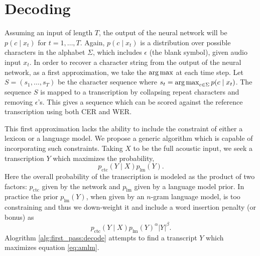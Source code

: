 \section{Decoding}
\label{sec:first_pass:decoding}

Assuming an input of length $T$, the output of the neural network will be $p(c
\mid x_t)$ for $t = 1,\ldots,T$. Again, $p(c \mid x_t)$ is a distribution over
possible characters in the alphabet $\Sigma$, which includes $\epsilon$ (the
blank symbol), given audio input $x_t$. In order to recover a character string
from the output of the neural network, as a first approximation, we take the
$\operatorname*{arg\,max}$ at each time step. Let $S = (s_1,\ldots,s_T)$ be the character
sequence where $s_t = \operatorname*{arg\,max}_{c \in \Sigma} p(c \mid x_t)$. The sequence $S$
is mapped to a transcription by collapsing repeat characters and removing
$\epsilon$'s.  This gives a sequence which can be scored against the reference
transcription using both CER and WER.

This first approximation lacks the ability to include the constraint of either
a lexicon or a language model. We propose a generic algorithm which is capable
of incorporating such constraints. Taking $X$ to be the full acoustic input, we
seek a transcription $Y$ which maximizes the probability,
\begin{equation}
  \label{eq:joint} p_{\text{ctc}}(Y \mid X) p_{\text{lm}}(Y).  
\end{equation} 
Here the overall probability of the transcription is modeled as the product of
two factors: $p_{\text{ctc}}$ given by the network and $p_{\text{lm}}$ given by
a language model prior. In practice the prior $p_{\text{lm}}(Y)$, when given by
an $n$-gram language model, is too constraining and thus we down-weight it and
include a word insertion penalty (or bonus) as
\begin{equation}\label{eq:amlm}
    p_{\text{ctc}}(Y \mid X) p_{\text{lm}}(Y)^\alpha |Y|^\beta.
\end{equation}
Alogrithm \ref{alg:first_pass:decode} attempts to find a transcript $Y$ which
maximizes equation \ref{eq:amlm}.


